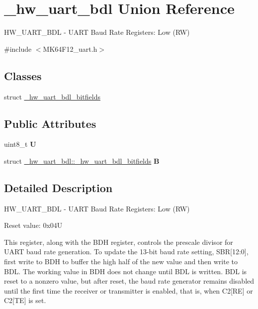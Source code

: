\hypertarget{union__hw__uart__bdl}{}\section{\+\_\+hw\+\_\+uart\+\_\+bdl Union Reference}
\label{union__hw__uart__bdl}


H\+W\+\_\+\+U\+A\+R\+T\+\_\+\+B\+DL -\/ U\+A\+RT Baud Rate Registers\+: Low (RW)  




{\ttfamily \#include $<$M\+K64\+F12\+\_\+uart.\+h$>$}

\subsection*{Classes}
\begin{DoxyCompactItemize}
\item 
struct \hyperlink{struct__hw__uart__bdl_1_1__hw__uart__bdl__bitfields}{\+\_\+hw\+\_\+uart\+\_\+bdl\+\_\+bitfields}
\end{DoxyCompactItemize}
\subsection*{Public Attributes}
\begin{DoxyCompactItemize}
\item 
uint8\+\_\+t {\bfseries U}\hypertarget{union__hw__uart__bdl_add52978ae5af206a36f193a2266ba2bf}{}\label{union__hw__uart__bdl_add52978ae5af206a36f193a2266ba2bf}

\item 
struct \hyperlink{struct__hw__uart__bdl_1_1__hw__uart__bdl__bitfields}{\+\_\+hw\+\_\+uart\+\_\+bdl\+::\+\_\+hw\+\_\+uart\+\_\+bdl\+\_\+bitfields} {\bfseries B}\hypertarget{union__hw__uart__bdl_a9c6effc0a2367e9ccdb9587707ee3927}{}\label{union__hw__uart__bdl_a9c6effc0a2367e9ccdb9587707ee3927}

\end{DoxyCompactItemize}


\subsection{Detailed Description}
H\+W\+\_\+\+U\+A\+R\+T\+\_\+\+B\+DL -\/ U\+A\+RT Baud Rate Registers\+: Low (RW) 

Reset value\+: 0x04U

This register, along with the B\+DH register, controls the prescale divisor for U\+A\+RT baud rate generation. To update the 13-\/bit baud rate setting, S\+BR\mbox{[}12\+:0\mbox{]}, first write to B\+DH to buffer the high half of the new value and then write to B\+DL. The working value in B\+DH does not change until B\+DL is written. B\+DL is reset to a nonzero value, but after reset, the baud rate generator remains disabled until the first time the receiver or transmitter is enabled, that is, when C2\mbox{[}RE\mbox{]} or C2\mbox{[}TE\mbox{]} is set. 


